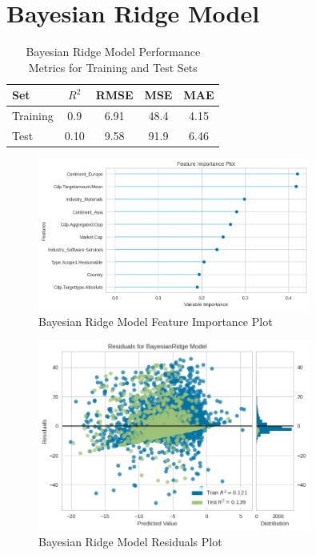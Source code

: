 \section{Bayesian Ridge Model}

\begin{table}[H]
    \centering
    \caption{Bayesian Ridge Model Performance Metrics for Training and Test Sets}
    \label{tab:bayesian_ridge_performance}
    \begin{tabular}{lcccc}
    \hline
    Set & $R^2$ & RMSE & MSE & MAE \\ 
    \hline
    Training & 0.9 & 6.91 & 48.4 & 4.15 \\
    Test & 0.10 & 9.58 & 91.9 & 6.46 \\
    \hline
    \end{tabular}
\end{table}

\begin{figure}[H]
    \centering
    \includegraphics[width=0.8\textwidth]{figures/Bayes_Importance.png}
    \caption{Bayesian Ridge Model Feature Importance Plot}
    \label{fig:bayesian_ridge_feature_importance}
\end{figure}

\begin{figure}[H]
    \centering
    \includegraphics[width=0.8\textwidth]{figures/Bayes_Residuals.png}
    \caption{Bayesian Ridge Model Residuals Plot}
    \label{fig:bayesian_ridge_residuals}
\end{figure}

